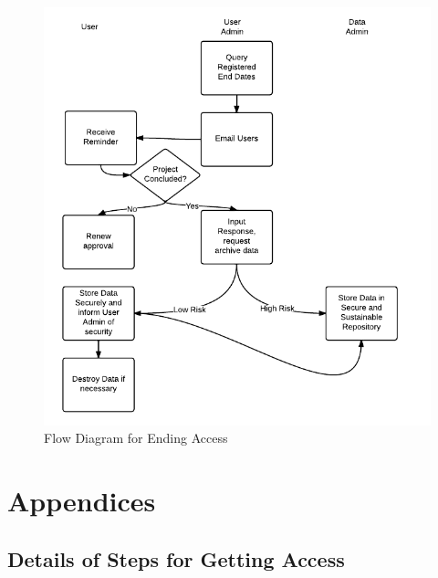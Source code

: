 \documentclass[a4paper]{article}
\begin{document}
\begin{figure}[!h]
\centering
\includegraphics[width=\textwidth]{MortalityEndingAccess.png}
\caption{Flow Diagram for Ending Access}
\label{fig:DataAccessFlowDiagram-EndAccess}
\end{figure}
\clearpage
\section{Appendices}
\label{sec-5}
\subsection{Details of Steps for Getting Access}
\label{sec-5-1}
\end{document}
